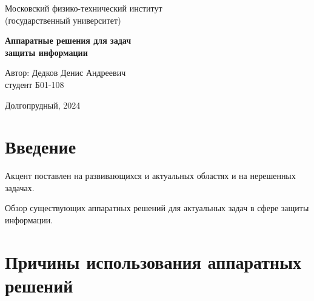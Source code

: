 \documentclass[a4paper,12pt]{article}
\begin{document}
	
\begin{center}
	
        \normalsize Московский физико-технический институт \\
						(государственный университет)
	\vspace{46ex}
	

	\Large \textbf{Аппаратные решения для задач \\ защиты информации}

	\vspace{40ex}
\end{center}
\begin{flushright}
	\normalsize{Автор: Дедков Денис Андреевич \\ студент Б01-108 \\}
\end{flushright}

\vfill

\begin{center}
	Долгопрудный, 2024
\end{center}

\thispagestyle{empty} %

\newpage

\tableofcontents{}
\newpage

\section{Введение}

Акцент поставлен на развивающихся и актуальных областях и на нерешенных задачах.

Обзор существующих аппаратных решений для актуальных задач в сфере защиты информации.


\section{Причины использования аппаратных решений}





\def\firstcircle{(0,0) circle (2.5cm)}
\def\secondcircle{(0:4cm) circle (2.5cm)}
\def\secondcircle{(0:4cm) circle (2.5cm)}


\end{document}
